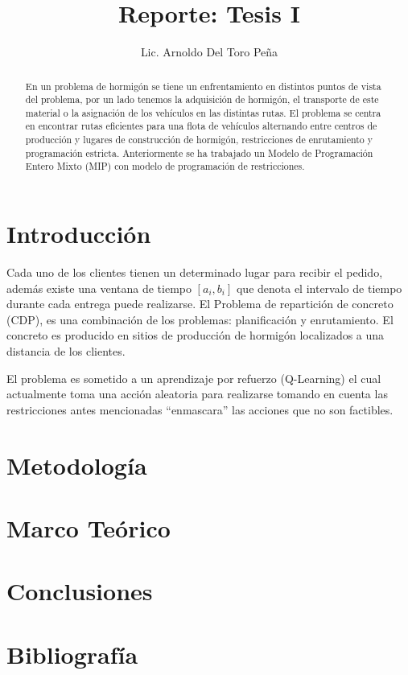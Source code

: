 \documentclass[12pt,letterpaper]{article}
\title{Reporte: Tesis I}
\author{Lic. Arnoldo Del Toro Peña}
\begin{document}
	\maketitle
	
	\begin{abstract}
		En un problema de hormigón se tiene un enfrentamiento en distintos puntos de vista del problema, por un lado tenemos la adquisición de hormigón, el transporte de este material o la asignación de los vehículos en las distintas rutas. El problema se centra en encontrar rutas eficientes para una flota de vehículos alternando entre centros de producción y lugares de construcción de hormigón, restricciones de enrutamiento y programación estricta. Anteriormente se ha trabajado un Modelo de Programación Entero Mixto (MIP) con modelo de programación de restricciones.
	\end{abstract}

	\begin{multicols}{2}
		
		\section{Introducci\'on}
		Cada uno de los clientes tienen un determinado lugar para recibir el pedido, además existe una ventana de tiempo $[a_i,b_i]$ que denota el intervalo de tiempo durante cada entrega puede realizarse. El Problema de repartición de concreto (CDP), es una combinación de los problemas: planificación y enrutamiento. El concreto es producido en sitios de producción de hormigón localizados a una distancia de los clientes.
		
		El problema es sometido a un aprendizaje por refuerzo  (Q-Learning) el cual actualmente toma una acción aleatoria para realizarse tomando en cuenta las restricciones antes mencionadas ``enmascara'' las acciones que no son factibles.  
		\section{Metodolog\'ia}
		
		
		\section{Marco Te\'orico}
		
		\section{Conclusiones}
		
	\end{multicols}

	\section{Bibliograf\'ia}
	
	
\end{document}
